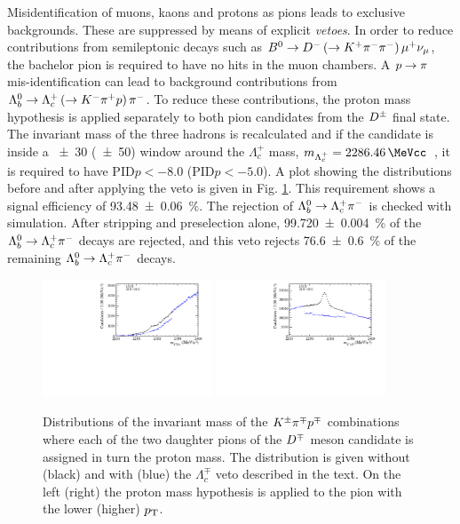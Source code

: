 Misidentification of muons, kaons and protons as pions leads to exclusive backgrounds. 
These are suppressed by means of explicit \emph{vetoes}. In order to 
reduce contributions from semileptonic decays such as
$B^0\rightarrow D^-\left(\rightarrow K^+\pi^-\pi^-\right)\mu^{+}\nu_{\mu}$, the bachelor pion is required
to have no hits in the muon chambers.
A $p\rightarrow\pi$ mis-identification can lead to background contributions from
$\Lambda^0_b\rightarrow\Lambda_c^{+}\left(\rightarrow K^-\pi^+ p\right)\pi^-$. To reduce these
contributions, the proton mass hypothesis is applied separately to both pion candidates
from the $D^\pm$ final state. The invariant mass of the three hadrons is
recalculated and if the candidate is inside a \SI{\pm30}{\MeVcc} (\SI{\pm50}{\MeVcc}) window around the
$\Lambda_c^{+}$ mass, $m_{\Lambda_c^{+}} = \SI{2286.46}{\MeVcc}$~\cite{PDG}, it is
required to have PID$p<-8.0$ (PID$p<-5.0$). 
A plot showing the distributions before
and after applying the veto is given in Fig. \ref{fig:lambdaveto}. This requirement
shows a signal efficiency of \SI{93.48\pm0.06}{\percent}. The rejection of
$\Lambda^0_b\rightarrow\Lambda_c^{+}\pi^-$ is checked with simulation. 
After stripping and preselection alone, \SI{99.720\pm0.004}{\percent} of the
$\Lambda^0_b\rightarrow\Lambda_c^{+}\pi^-$ decays are rejected, and this veto rejects
\SI{76.6\pm0.6}{\percent} of the remaining $\Lambda^0_b\rightarrow\Lambda_c^{+}\pi^-$ decays.

\begin{figure}[t]
	\begin{center}
		\includegraphics[width=0.45\textwidth]{02Selection/figs/LcHypo1.pdf}
		\includegraphics[width=0.45\textwidth]{02Selection/figs/LcHypo2.pdf}
	\end{center}
        \vspace{-2mm}
	\caption{Distributions of the invariant mass of the $K^\pm\pi^\mp p^\mp$ combinations
	where each of the two daughter pions of the $D^\mp$ meson candidate is assigned in turn the proton mass. The
	distribution is given without (black) and with (blue) the $\Lambda_c^{\mp}$
	veto described in the text. On the left (right) the proton mass hypothesis is
	applied to the pion with the lower (higher) $\mbox{$p_{\rm T}$}$.}
	\label{fig:lambdaveto}
\end{figure}

